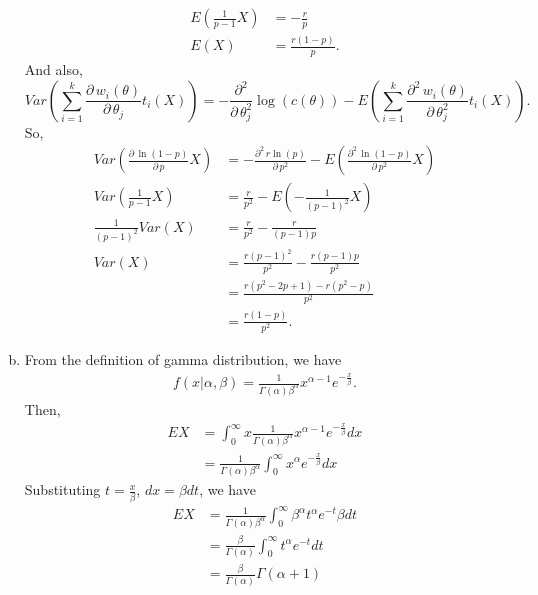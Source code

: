 \documentclass[14pt]{elegantbook}
\begin{document}
\begin{solution}
\begin{enumerate}[(a)]
\begin{align*}
                E\left(\frac{1}{p-1}X\right)&=-\frac{r}{p}\\
                E(X)&=\frac{r(1-p)}{p}. 
            \end{align*}
            And also, 
            \[
                Var\left(\sum_{i=1}^k\frac{\partial\,w_i(\theta)}{\partial\,\theta_j}t_i(X)\right)=-\frac{\partial^2}{\partial\,\theta_j^2}\log(c(\theta))-E\left(\sum_{i=1}^k\frac{\partial^2\,w_i(\theta)}{\partial\,\theta_j^2}t_i(X)\right).
            \]
            So, 
            \begin{align*}
                Var\left(\frac{\partial\,\ln(1-p)}{\partial\,p}X\right)&=-\frac{\partial^2\,r\ln(p)}{\partial\,p^2}-E\left(\frac{\partial^2\,\ln(1-p)}{\partial\,p^2}X\right)\\
                Var\left(\frac{1}{p-1}X\right)&=\frac{r}{p^2}-E\left(-\frac{1}{(p-1)^2}X\right)\\
                \frac{1}{(p-1)^2}Var(X)&=\frac{r}{p^2}-\frac{r}{(p-1)p}\\
                Var(X)&=\frac{r(p-1)^2}{p^2}-\frac{r(p-1)p}{p^2}\\
                &=\frac{r(p^2-2p+1)-r(p^2-p)}{p^2}\\
                &=\frac{r(1-p)}{p^2}. 
            \end{align*}
            \item From the definition of gamma distribution, we have
            \begin{align*}
                f(x|\alpha ,\beta )=\frac{1}{\Gamma(\alpha )\beta ^{\alpha }}x^{\alpha -1}e^{-\frac{x}{\beta }}. 
            \end{align*}
            Then, 
            \begin{align*}
                EX&=\int_0^\infty x\frac{1}{\Gamma(\alpha )\beta ^{\alpha }}x^{\alpha -1}e^{-\frac{x}{\beta }}dx\\
                &=\frac{1}{\Gamma(\alpha )\beta ^{\alpha }}\int_0^\infty x^{\alpha }e^{-\frac{x}{\beta }}dx
            \end{align*}
            Substituting $t=\frac{x}{\beta}$, $dx=\beta dt$, we have
            \begin{align*}
                EX&=\frac{1}{\Gamma(\alpha )\beta ^{\alpha }}\int_0^\infty \beta^\alpha t^{\alpha }e^{-t}\beta dt\\
                &=\frac{\beta}{\Gamma(\alpha )}\int_0^\infty t^{\alpha}e^{-t}dt\\
                &=\frac{\beta}{\Gamma(\alpha )}\Gamma(\alpha+1)\\

\end{align*}
\end{enumerate}
\end{solution}
\end{document}

